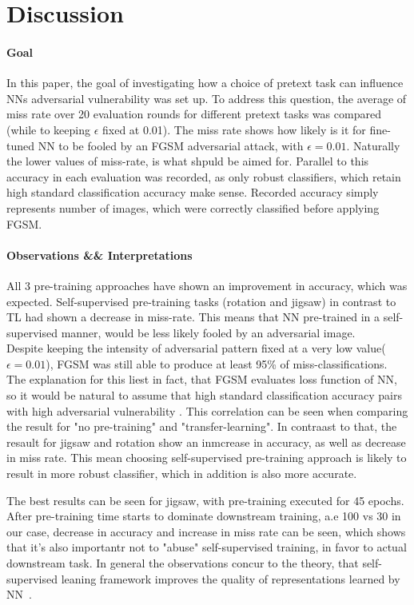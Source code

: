 \section{Discussion}

\paragraph{Goal}In this paper,
the goal of investigating how a choice of pretext task can influence NNs adversarial vulnerability was set up.
To address this question, the average of miss rate over 20 evaluation rounds for different pretext tasks was compared
(while to keeping $\epsilon$ fixed at 0.01).
The miss rate shows how likely is it for fine-tuned NN to be fooled by an FGSM adversarial attack,
with $\epsilon = 0.01$.
Naturally the lower values of miss-rate, is what shpuld be aimed for.
Parallel to this accuracy in each evaluation was recorded, as only robust classifiers, which retain high standard
classification accuracy make sense.
Recorded accuracy simply represents number of images, which were correctly classified before applying FGSM.

\paragraph{Observations \&\& Interpretations}
All 3 pre-training approaches have shown an improvement in accuracy, which was expected.
Self-supervised pre-training tasks (rotation and jigsaw) in contrast to TL had shown a decrease
in miss-rate.
This means that NN pre-trained in a self-supervised manner, would be less likely fooled by an adversarial image.
\\
Despite keeping the intensity of adversarial pattern fixed at a very low value($\epsilon = 0.01$),
FGSM was still able to produce at least 95\% of miss-classifications.
The explanation for this liest in fact, that FGSM evaluates loss function of NN,
so it would be natural to assume that high standard classification accuracy pairs with high adversarial vulnerability
\cite{https://doi.org/10.48550/arxiv.1805.12152}.
This correlation can be seen when comparing the result for "no pre-training" and "transfer-learning".
In contraast to that, the resault for jigsaw and rotation show an inmcrease in accuracy, as well
as decrease in miss rate.
This mean choosing self-supervised pre-training approach is likely to result in more robust classifier,
which in addition is also more accurate.

The best results can be seen for jigsaw, with pre-training executed for 45 epochs.
After pre-training time starts to dominate downstream training, a.e 100 vs 30 in our case,
decrease in accuracy and increase in miss rate can be seen, which shows that it's also importantr
not to "abuse" self-supervised training, in favor to actual downstream task.
In general the observations concur to the theory, that self-supervised leaning framework improves the quality of representations
learned by NN~\cite{kolesnikov2019revisiting}.


